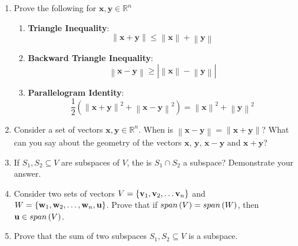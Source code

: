 \documentclass[9pt]{article}
\def\mf{\ensuremath\mathbf}
\def\lp{\ensuremath\left(}
\def\rp{\ensuremath\right)}
\def\lc{\ensuremath\left\{}
\def\rc{\ensuremath\right\}}
\newcommand{\ct}[1]{\lp #1\rp}
\begin{document}
\begin{multicols}{2}
\begin{enumerate}
      \item Prove the following for $\mathbf{x}, \mathbf{y} \in \mathbb{R}^n$
      \begin{enumerate}
          \item {\small \textbf{Triangle Inequality}}:
          $$\left\lVert \mathbf{x} + \mathbf{y}\right\rVert \leq \left\lVert \mathbf{x}\right\rVert + \left\lVert \mathbf{y}\right\rVert$$
          \item {\small \textbf{Backward Triangle Inequality}}:
          $$\left\lVert \mathbf{x} - \mathbf{y}\right\rVert  \geq \left\lvert \left\lVert \mathbf{x}\right\rVert - \left\lVert \mathbf{y}\right\rVert \right\rvert$$
          \item {\small \textbf{Parallelogram Identity}}:
          $$\frac{1}{2} \left(\left\lVert \mathbf{x} + \mathbf{y}\right\rVert^2 + \left\lVert \mathbf{x} - \mathbf{y}\right\rVert^2 \right) = \left\lVert \mathbf{x}\right\rVert^2 + \left\lVert \mathbf{y}\right\rVert^2$$
      \end{enumerate}
  
      \item Consider a set of vectors $\mathbf{x}, \mathbf{y} \in \mathbb{R}^n$. When is $\left\lVert \mathbf{x} - \mathbf{y} \right\rVert = \left\lVert \mathbf{x} + \mathbf{y}\right\rVert$? What can you say about the geometry of the vectors $\mathbf{x},\,\mathbf{y},\,\mathbf{x} - \mathbf{y}$ and $\mathbf{x} + \mathbf{y}$?
      
      \item If $S_1, S_2 \subseteq V$ are subspaces of $V$, the is $S_1 \cap S_2$ a subspace? Demonstrate your answer.
  
      \item Consider two sets of vectors $V = \lc \mf{v}_1, \mf{v}_2, \ldots \mf{v}_n\rc$ and $W = \lc \mf{w}_1, \mf{w}_2, \ldots, \mf{w}_n, \mf{u}\rc$. Prove that if $span\ct{V} = span\ct{W}$, then $\mf{u} \in span\ct{V}$.
      
      \item Prove that the sum of two subspaces $S_1, S_2 \subseteq V$ is a subspace.
      

\end{enumerate}
\end{multicols}
\end{document}
